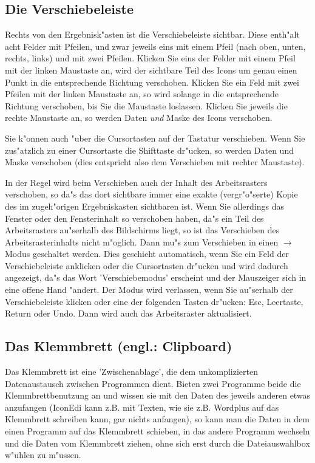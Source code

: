 \subsection{Die Verschiebeleiste} 
Rechts von den Ergebnisk"asten ist die Verschiebeleiste sichtbar.
Diese enth"alt acht Felder mit Pfeilen, und zwar jeweils eins mit 
einem Pfeil (nach oben, unten, rechts, links) und mit zwei Pfeilen.
Klicken Sie eins der Felder mit einem Pfeil mit der linken 
Maustaste an, wird der sichtbare Teil des Icons um genau einen 
Punkt in die entsprechende Richtung verschoben. Klicken Sie ein 
Feld mit zwei Pfeilen mit der linken Maustaste an, so wird solange 
in die entsprechende Richtung verschoben, bis Sie die Maustaste 
loslassen. Klicken Sie jeweils die rechte Maustaste an, so werden
Daten {\sl und} Maske des Icons verschoben.

Sie k"onnen auch "uber die Cursortasten auf der Tastatur verschieben.
Wenn Sie zus"atzlich zu einer Cursortaste die Shifttaste dr"ucken,
so werden Daten und Maske verschoben (dies entspricht also dem 
Verschieben mit rechter Maustaste).

In der Regel wird beim Verschieben auch der Inhalt des 
Arbeitsrasters verschoben, so da"s das dort sichtbare immer eine
exakte (vergr"o"serte) Kopie des im zugeh"origen Ergebniskasten 
sichtbaren ist. Wenn Sie allerdings das Fenster oder den
Fensterinhalt so verschoben haben, da"s ein Teil des 
Arbeitsrasters au"serhalb des Bildschirms liegt, so ist das
Verschieben des Arbeitsrasterinhalts nicht m"oglich. Dann mu"s 
zum Verschieben in einen $\to$Modus geschaltet werden. Dies 
geschieht automatisch, wenn Sie ein Feld der Verschiebeleiste 
anklicken oder die Cursortasten dr"ucken und wird dadurch angezeigt, 
da"s das Wort 'Verschiebemodus' erscheint und der Mauszeiger sich 
in eine offene Hand "andert. Der Modus wird verlassen, wenn Sie
au"serhalb der Verschiebeleiste klicken oder eine der folgenden
Tasten dr"ucken: Esc, Leertaste, Return oder Undo. Dann wird auch
das Arbeitsraster aktualisiert.

\subsection{Das Klemmbrett (engl.: Clipboard)}
  
Das Klemmbrett ist eine 'Zwischenablage', die dem unkomplizierten
Datenaustausch zwischen Programmen dient. Bieten zwei Programme 
beide die Klemmbrettbenutzung an und wissen sie mit den Daten des 
jeweils anderen etwas anzufangen (IconEdi kann z.B. mit Texten,
wie sie z.B. Wordplus auf das Klemmbrett schreiben kann, gar 
nichts anfangen), so kann man die Daten in dem einen Programm 
auf das Klemmbrett schieben, in das andere Programm wechseln und 
die Daten vom Klemmbrett ziehen, ohne sich erst durch die 
Dateiauswahlbox w"uhlen zu m"ussen.

